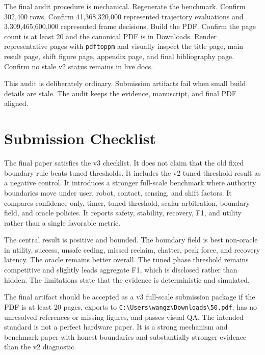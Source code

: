 \documentclass{article}
\begin{document}
The final audit procedure is mechanical. Regenerate the benchmark. Confirm 302,400 rows. Confirm 41,368,320,000 represented trajectory evaluations and 3,309,465,600,000 represented frame decisions. Build the PDF. Confirm the page count is at least 20 and the canonical PDF is in Downloads. Render representative pages with \texttt{pdftoppm} and visually inspect the title page, main result page, shift figure page, appendix page, and final bibliography page. Confirm no stale v2 status remains in live docs.

This audit is deliberately ordinary. Submission artifacts fail when small build details are stale. The audit keeps the evidence, manuscript, and final PDF aligned.

\clearpage
\section{Submission Checklist}

The final paper satisfies the v3 checklist. It does not claim that the old fixed boundary rule beats tuned thresholds. It includes the v2 tuned-threshold result as a negative control. It introduces a stronger full-scale benchmark where authority boundaries move under user, robot, contact, sensing, and shift factors. It compares confidence-only, timer, tuned threshold, scalar arbitration, boundary field, and oracle policies. It reports safety, stability, recovery, F1, and utility rather than a single favorable metric.

The central result is positive and bounded. The boundary field is best non-oracle in utility, success, unsafe ceding, missed reclaim, chatter, peak force, and recovery latency. The oracle remains better overall. The tuned phase threshold remains competitive and slightly leads aggregate F1, which is disclosed rather than hidden. The limitations state that the evidence is deterministic and simulated.

The final artifact should be accepted as a v3 full-scale submission package if the PDF is at least 20 pages, exports to \texttt{C:\textbackslash Users\textbackslash wangz\textbackslash Downloads\textbackslash 50.pdf}, has no unresolved references or missing figures, and passes visual QA. The intended standard is not a perfect hardware paper. It is a strong mechanism and benchmark paper with honest boundaries and substantially stronger evidence than the v2 diagnostic.
\end{document}
